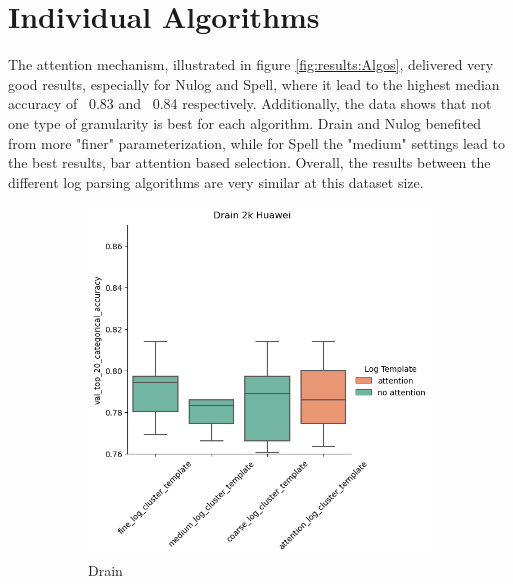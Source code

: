 \section{Individual Algorithms}
\label{sec:Results:Algos}
The attention mechanism, illustrated in figure \ref{fig:results:Algos}, delivered very good results, especially for Nulog and Spell, where it lead to the highest median accuracy of ~0.83 and ~0.84 respectively. Additionally, the data shows that not one type of granularity is best for each algorithm. Drain and Nulog benefited from more "finer" parameterization, while for Spell the "medium" settings lead to the best results, bar attention based selection. Overall, the results between the different log parsing algorithms are very similar at this dataset size. 

\begin{figure}[H]
     \centering
     \begin{subfigure}[b]{0.45\textwidth}
         \centering
        \includegraphics[keepaspectratio=true,scale=0.45]{figures/5_results/Drain_Huawei_2k.png}
         \caption{Drain}
         \label{fig:results:drain}
     \end{subfigure}
     \hfill
     \begin{subfigure}[b]{0.45\textwidth}
         \centering

\end{subfigure}
\end{figure}
